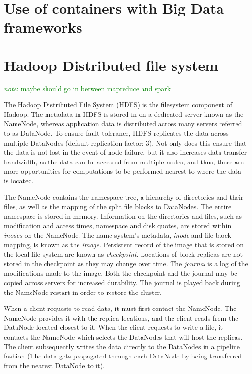 \documentclass{report}
\newcommand{\note}[1]{\textcolor{green}{\textit{note}: #1}}
\begin{document}
     \section{Use of containers with Big Data frameworks}
     \section{Hadoop Distributed file system} 
        \note{maybe should go in between mapreduce and spark} 

        The Hadoop Distributed File System (HDFS)\cite{hadoop} 
        is the filesystem component of Hadoop. The metadata in 
        HDFS is stored in on a dedicated server known as the 
        NameNode, whereas application data is distributed across 
        many servers referred to as DataNode. To ensure fault 
        tolerance, HDFS replicates the data across multiple 
        DataNodes (default replication factor: 3). Not only does 
        this ensure that the data is not lost in the event of node
        failure, but it also increases data transfer bandwidth, as
        the data can be accessed from multiple nodes, and thus, 
        there are more opportunities for computations to be 
        performed nearest to where the data is located. 

        The NameNode contains the namespace tree, a hierarchy of 
        directories and their files, as well as the mapping of the 
        split file blocks to DataNodes. The entire namespace is 
        stored in memory. Information on the directories and files,
        such as modification and access times, namespace and disk 
        quotes, are stored within \textit{inodes} on the NameNode. 
        The name system's metadata, \textit{inode} and file block 
        mapping, is known as the \textit{image}. Persistent record 
        of the image that is stored on the local file system are 
        known as \textit{checkpoint}. Locations of block replicas 
        are not stored in the checkpoint as they may change over 
        time. The \textit{journal} is a log of the modifications 
        made to the image. Both the checkpoint and the journal may 
        be copied across servers for increased durability. The 
        journal is played back during the NameNode restart in order 
        to restore the cluster.

        When a client requests to read data, it must first contact 
        the NameNode. The NameNode provides it with the replica 
        locations, and the client reads from the DataNode located 
        closest to it. When the client requests to write a file, it
        contacts the NameNode which selects the DataNodes that will 
        host the replicas. The client subsequently writes the data 
        directly to the DataNodes in a pipeline fashion (The data 
        gets propagated through each DataNode by being transferred
        from the nearest DataNode to it).
\end{document}
